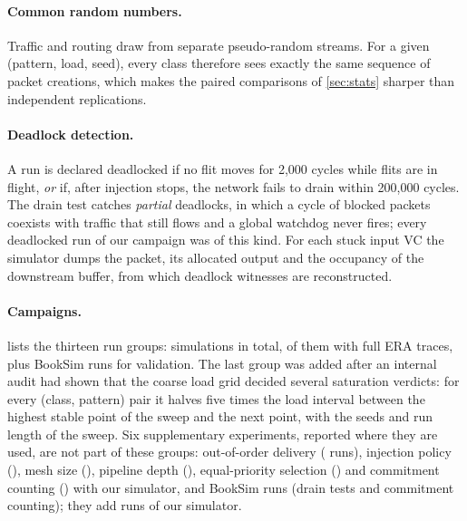 \paragraph{Common random numbers.} Traffic and routing draw from separate pseudo-random streams. For a given (pattern, load, seed), every class therefore sees exactly the same sequence of packet creations, which makes the paired comparisons of \cref{sec:stats} sharper than independent replications.

\paragraph{Deadlock detection.} A run is declared deadlocked if no flit moves for 2,000 cycles while flits are in flight, \emph{or} if, after injection stops, the network fails to drain within 200,000 cycles. The drain test catches \emph{partial} deadlocks, in which a cycle of blocked packets coexists with traffic that still flows and a global watchdog never fires; every deadlocked run of our campaign was of this kind. For each stuck input VC the simulator dumps the packet, its allocated output and the occupancy of the downstream buffer, from which deadlock witnesses are reconstructed.

\paragraph{Campaigns.}  lists the thirteen run groups:  simulations in total,  of them with full ERA traces, plus  BookSim runs for validation. The last group was added after an internal audit had shown that the coarse load grid decided several saturation verdicts: for every (class, pattern) pair it halves five times the load interval between the highest stable point of the sweep and the next point, with the seeds and run length of the sweep. Six supplementary experiments, reported where they are used, are not part of these groups: out-of-order delivery ( runs), injection policy (), mesh size (), pipeline depth (), equal-priority selection () and commitment counting () with our simulator, and  BookSim runs (drain tests and commitment counting); they add  runs of our simulator.

